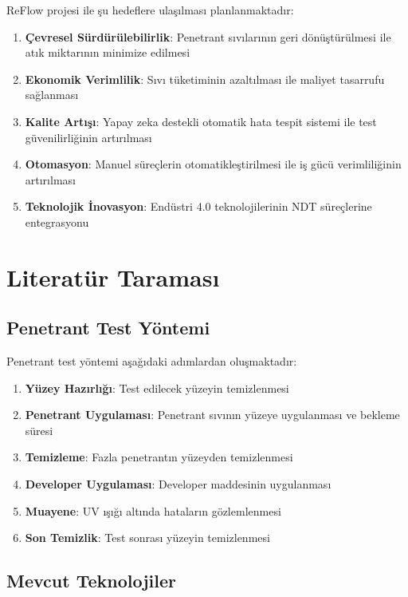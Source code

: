 \documentclass[12pt,a4paper]{article}
\begin{document}
ReFlow projesi ile şu hedeflere ulaşılması planlanmaktadır:

\begin{enumerate}
    \item \textbf{Çevresel Sürdürülebilirlik}: Penetrant sıvılarının geri dönüştürülmesi ile atık miktarının minimize edilmesi
    \item \textbf{Ekonomik Verimlilik}: Sıvı tüketiminin azaltılması ile maliyet tasarrufu sağlanması
    \item \textbf{Kalite Artışı}: Yapay zeka destekli otomatik hata tespit sistemi ile test güvenilirliğinin artırılması
    \item \textbf{Otomasyon}: Manuel süreçlerin otomatikleştirilmesi ile iş gücü verimliliğinin artırılması
    \item \textbf{Teknolojik İnovasyon}: Endüstri 4.0 teknolojilerinin NDT süreçlerine entegrasyonu
\end{enumerate}

\section{Literatür Taraması}

\subsection{Penetrant Test Yöntemi}

Penetrant test yöntemi aşağıdaki adımlardan oluşmaktadır:

\begin{enumerate}
    \item \textbf{Yüzey Hazırlığı}: Test edilecek yüzeyin temizlenmesi
    \item \textbf{Penetrant Uygulaması}: Penetrant sıvının yüzeye uygulanması ve bekleme süresi
    \item \textbf{Temizleme}: Fazla penetrantın yüzeyden temizlenmesi
    \item \textbf{Developer Uygulaması}: Developer maddesinin uygulanması
    \item \textbf{Muayene}: UV ışığı altında hataların gözlemlenmesi
    \item \textbf{Son Temizlik}: Test sonrası yüzeyin temizlenmesi
\end{enumerate}

\subsection{Mevcut Teknolojiler}
\end{document}
